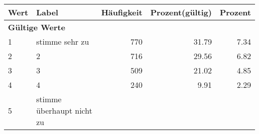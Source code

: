      \begin{longtable}{lXrrr}
     \toprule
     \textbf{Wert} & \textbf{Label} & \textbf{Häufigkeit} & \textbf{Prozent(gültig)} & \textbf{Prozent} \\
     \endhead
     \midrule
     \multicolumn{5}{l}{\textbf{Gültige Werte}}\\

     1 &
     \multicolumn{1}{X}{ stimme sehr zu   } &


       \num{770} &
       \num[round-mode=places,round-precision=2]{31,79} &
         \num[round-mode=places,round-precision=2]{7,34} \\

     2 &
     \multicolumn{1}{X}{ 2   } &


       \num{716} &
       \num[round-mode=places,round-precision=2]{29,56} &
         \num[round-mode=places,round-precision=2]{6,82} \\

     3 &
     \multicolumn{1}{X}{ 3   } &


       \num{509} &
       \num[round-mode=places,round-precision=2]{21,02} &
         \num[round-mode=places,round-precision=2]{4,85} \\

     4 &
     \multicolumn{1}{X}{ 4   } &


       \num{240} &
       \num[round-mode=places,round-precision=2]{9,91} &
         \num[round-mode=places,round-precision=2]{2,29} \\

     5 &
     \multicolumn{1}{X}{ stimme überhaupt nicht zu   } &



\end{longtable}
